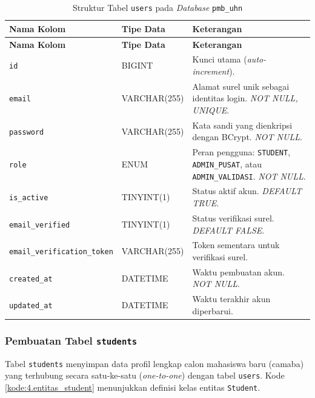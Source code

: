\begin{longtable}{|L{0.36\textwidth}|L{0.18\textwidth}|L{0.32\textwidth}|}
	\caption{Struktur Tabel \texttt{users} pada \textit{Database} \texttt{pmb\_uhn}}
	\label{fig:4.db.users}\\
	\hline
	\textbf{Nama Kolom} & \textbf{Tipe Data} & \textbf{Keterangan} \\
	\hline
	\endfirsthead
	\hline
	\textbf{Nama Kolom} & \textbf{Tipe Data} & \textbf{Keterangan} \\
	\hline
	\endhead
	\texttt{id} & BIGINT & Kunci utama (\textit{auto-increment}). \\
	\hline
	\texttt{email} & VARCHAR(255) & Alamat surel unik sebagai identitas login. \textit{NOT NULL, UNIQUE}. \\
	\hline
	\texttt{password} & VARCHAR(255) & Kata sandi yang dienkripsi dengan BCrypt. \textit{NOT NULL}. \\
	\hline
	\texttt{role} & ENUM & Peran pengguna: \texttt{STUDENT}, \texttt{ADMIN\_PUSAT}, atau \texttt{ADMIN\_VALIDASI}. \textit{NOT NULL}. \\
	\hline
	\texttt{is\_active} & TINYINT(1) & Status aktif akun. \textit{DEFAULT TRUE}. \\
	\hline
	\texttt{email\_verified} & TINYINT(1) & Status verifikasi surel. \textit{DEFAULT FALSE}. \\
	\hline
	\texttt{email\_verification\_token} & VARCHAR(255) & Token sementara untuk verifikasi surel. \\
	\hline
	\texttt{created\_at} & DATETIME & Waktu pembuatan akun. \textit{NOT NULL}. \\
	\hline
	\texttt{updated\_at} & DATETIME & Waktu terakhir akun diperbarui. \\
	\hline
\end{longtable}

\subsubsection{Pembuatan Tabel \texttt{students}} \label{IV.DB.Students}

Tabel \texttt{students} menyimpan data profil lengkap calon mahasiswa baru (camaba) yang terhubung secara satu-ke-satu (\textit{one-to-one}) dengan tabel \texttt{users}. Kode \ref{kode:4.entitas_student} menunjukkan definisi kelas entitas \texttt{Student}.\par

